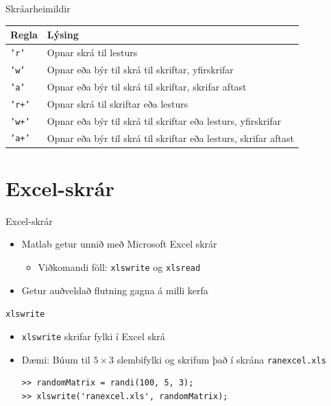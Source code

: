 \documentclass[handout]{beamer}
\begin{document}
\begin{frame}{Skráarheimildir}
\begin{center}
\begin{tabular}{ll}
\toprule
Regla&Lýsing\\
\midrule
\texttt{'r'}&Opnar skrá til lesturs\\
\texttt{'w'}&Opnar eða býr til skrá til skriftar, yfirskrifar\\
\texttt{'a'}&Opnar eða býr til skrá til skriftar, skrifar aftast\\
\texttt{'r+'}&Opnar skrá til skriftar eða lesturs\\
\texttt{'w+'}&Opnar eða býr til skrá til skriftar eða lesturs, yfirskrifar\\
\texttt{'a+'}&Opnar eða býr til skrá til skriftar eða lesturs, skrifar aftast\\
\bottomrule
\end{tabular}

\end{center}

\end{frame}

\section{Excel-skrár}

\begin{frame}{Excel-skrár}
\begin{itemize}
 \item Matlab getur unnið með Microsoft Excel skrár
 \begin{itemize}
  \item Viðkomandi föll: \texttt{xlswrite} og \texttt{xlsread}
 \end{itemize}
 \item Getur auðveldað flutning gagna á milli kerfa
\end{itemize}
\end{frame}

\begin{frame}[fragile]{\texttt{xlswrite}}
\begin{itemize}
 \item \texttt{xlswrite} skrifar fylki í Excel skrá
 \item Dæmi: Búum til $5 \times 3$ slembifylki og skrifum það í skrána \texttt{ranexcel.xls}
\begin{verbatim}
>> randomMatrix = randi(100, 5, 3); 
>> xlswrite('ranexcel.xls', randomMatrix); 
\end{verbatim}
\end{itemize}
\end{frame}
\end{document}
